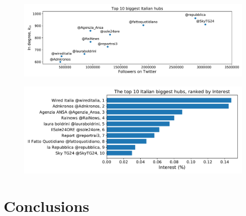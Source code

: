 \documentclass[11pt, twoside]{report}
\begin{document}
    \begin{figure}[htbp]
      \centering
      \includegraphics[width=\textwidth]{../../scripts/network_analysis/imgs/hubs_followers_ita.pdf}
      \caption{}
      \label{fig:hubs_followers_ita}
    \end{figure}

    \begin{figure}[htbp]
      \centering
      \includegraphics[width=\textwidth]{../../scripts/network_analysis/imgs/hubs_interest_ita.pdf}
      \caption{}
      \label{fig:hubs_followers_ita}
    \end{figure}




    

    

    


    \chapter{Conclusions}
\end{document}

